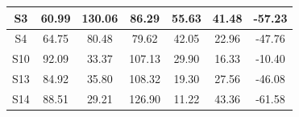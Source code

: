 \begin{table}[hp]
\begin{tabular}{ccccccc}
    \multicolumn{1}{|c|}{S3}                                                          & \multicolumn{1}{c|}{60.99}                                      & \multicolumn{1}{c|}{130.06}                                  & \multicolumn{1}{c|}{86.29}                                    & \multicolumn{1}{c|}{55.63}                                    & \multicolumn{1}{c|}{41.48}                                    & \multicolumn{1}{c|}{-57.23}                                    \\ \hline
    \multicolumn{1}{|c|}{S4}                                                          & \multicolumn{1}{c|}{64.75}                                      & \multicolumn{1}{c|}{80.48}                                   & \multicolumn{1}{c|}{79.62}                                    & \multicolumn{1}{c|}{42.05}                                    & \multicolumn{1}{c|}{22.96}                                    & \multicolumn{1}{c|}{-47.76}                                    \\ \hline
    \multicolumn{1}{|c|}{S10}                                                         & \multicolumn{1}{c|}{92.09}                                      & \multicolumn{1}{c|}{33.37}                                   & \multicolumn{1}{c|}{107.13}                                   & \multicolumn{1}{c|}{29.90}                                    & \multicolumn{1}{c|}{16.33}                                    & \multicolumn{1}{c|}{-10.40}                                    \\ \hline
    \multicolumn{1}{|c|}{S13}                                                         & \multicolumn{1}{c|}{84.92}                                      & \multicolumn{1}{c|}{35.80}                                   & \multicolumn{1}{c|}{108.32}                                   & \multicolumn{1}{c|}{19.30}                                    & \multicolumn{1}{c|}{27.56}                                    & \multicolumn{1}{c|}{-46.08}                                    \\ \hline
    \multicolumn{1}{|c|}{S14}                                                         & \multicolumn{1}{c|}{88.51}                                      & \multicolumn{1}{c|}{29.21}                                   & \multicolumn{1}{c|}{126.90}                                   & \multicolumn{1}{c|}{11.22}                                    & \multicolumn{1}{c|}{43.36}                                    & \multicolumn{1}{c|}{-61.58}                                    \\ \hline

\end{tabular}
\end{table}
